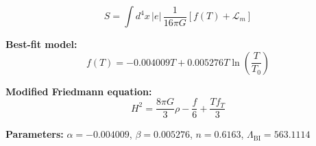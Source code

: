
\begin{equation}
  S = \int d^4x \, |e| \, \frac{1}{16\pi G} \left[ f(T) + \mathcal{L}_m \right]
\end{equation}

\textbf{Best-fit model:}
\begin{equation}
  f(T) = -0.004009 T + 0.005276 T \ln\!\left(\frac{T}{T_0}\right)
\end{equation}

\textbf{Modified Friedmann equation:}
\begin{equation}
  H^2 = \frac{8\pi G}{3} \rho - \frac{f}{6} + \frac{T f_T}{3}
\end{equation}

\textbf{Parameters:}
$\alpha = -0.004009$, \quad
$\beta = 0.005276$, \quad
$n = 0.6163$, \quad
$\Lambda_{\text{BI}} = 563.1114$